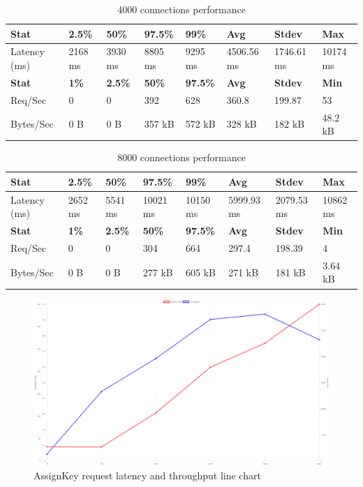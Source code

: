 \documentclass[../Main.tex]{subfiles}
\begin{document}
\begin{table}[H]
\centering
\begin{tabular}{|l|l|l|l|l|l|l|l|}
\hline
\rowcolor[HTML]{f56b00}
\textbf{Stat} & \textbf{2.5\%} & \textbf{50\%} & \textbf{97.5\%} & \textbf{99\%} & \textbf{Avg} & \textbf{Stdev} & \textbf{Max} \\ \hline
Latency (ms) & 2168 ms & 3930 ms & 8805 ms & 9295 ms & 4506.56 ms & 1746.61 ms & 10174 ms \\ \hline
\rowcolor[HTML]{f56b00}
\textbf{Stat} & \textbf{1\%} & \textbf{2.5\%} & \textbf{50\%} & \textbf{97.5\%} & \textbf{Avg} & \textbf{Stdev} & \textbf{Min} \\ \hline
Req/Sec & 0 & 0 & 392 & 628 & 360.8 & 199.87 & 53 \\ \hline
Bytes/Sec & 0 B & 0 B & 357 kB & 572 kB & 328 kB & 182 kB & 48.2 kB \\ \hline
\end{tabular}
 \caption{4000 connections performance}
 \label{4000-connections-performance}
\end{table}

\begin{table}[H]
\centering
\begin{tabular}{|l|l|l|l|l|l|l|l|}
\hline
\rowcolor[HTML]{f56b00}
\textbf{Stat} & \textbf{2.5\%} & \textbf{50\%} & \textbf{97.5\%} & \textbf{99\%} & \textbf{Avg} & \textbf{Stdev} & \textbf{Max} \\ \hline
Latency (ms) & 2652 ms & 5541 ms & 10021 ms & 10150 ms & 5999.93 ms & 2079.53 ms & 10862 ms \\ \hline
\rowcolor[HTML]{f56b00}
\textbf{Stat} & \textbf{1\%} & \textbf{2.5\%} & \textbf{50\%} & \textbf{97.5\%} & \textbf{Avg} & \textbf{Stdev} & \textbf{Min} \\ \hline
Req/Sec & 0 & 0 & 304 & 664 & 297.4 & 198.39 & 4 \\ \hline
Bytes/Sec & 0 B & 0 B & 277 kB & 605 kB & 271 kB & 181 kB & 3.64 kB \\ \hline
\end{tabular}
 \caption{8000 connections performance}
 \label{8000-connections-performance}
\end{table}

\begin{figure}[H]
  \centering
  \includegraphics[scale=0.22]{Figure/assignkey-line-chart.png}
  \caption{AssignKey request latency and throughput line chart}
  \label{fig:assignkey-line-chart}
\end{figure}
\end{document}
